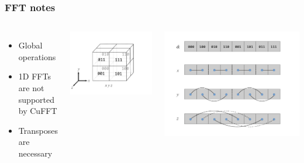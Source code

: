 \documentclass{beamer}
\begin{document}
\begin{frame}
\frametitle{FFT notes}
\begin{columns}
\begin{itemize}
\item Global operations
\item 1D FFTs are not supported by CuFFT
\item Transposes are necessary
\end{itemize}
\center \includegraphics[width=\textwidth]{../data/gpu/fft/fft_fig.png}

\center \includegraphics[width=\textwidth]{../data/gpu/fft/fft_fig2.png}
\end{columns}

\end{frame}
\end{document}

